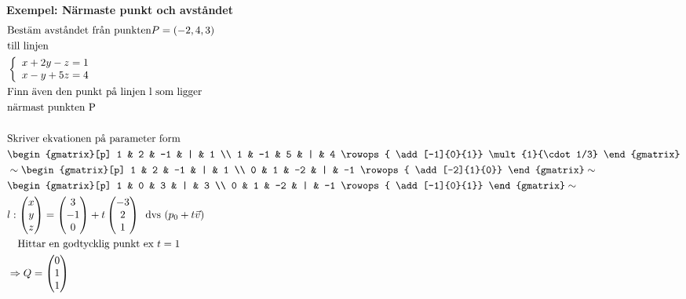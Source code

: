 \begin{multicols}{2}
\textbf{Exempel: Närmaste punkt och avståndet}
\begin{align*} 
  &\text{Bestäm avståndet från punkten} P=(-2,4,3) \\
  &\text{till linjen } \\
  &\left\{\begin{array}{r}
  x+2y-z=1 \\
  x-y+5z=4 
  \end{array}\right. \\  
  &\text{Finn även den punkt på linjen l som ligger} \\
  &\text{närmast punkten P}  \\
  &\\
  &\text{Skriver ekvationen på parameter form } \\
  &\begin{gmatrix}[p]
    1 & 2  & -1 & | & 1 \\
    1 & -1 &  5 & | & 4
    \rowops{
      \add[-1]{0}{1}}
      \mult{1}{\cdot 1/3}
  \end{gmatrix} \\
  &\sim{}
  \begin{gmatrix}[p]
    1 & 2  & -1 & | & 1 \\
    0 & 1 &  -2 & | & -1
    \rowops{
    \add[-2]{1}{0}}
  \end{gmatrix} \sim{}  \\
  &\begin{gmatrix}[p]
    1 & 0  &  3 & | & 3 \\
    0 & 1 &  -2 & | & -1
    \rowops{
    \add[-1]{0}{1}}
  \end{gmatrix} \sim{}  \\
  &l:\begin{pmatrix} x \\ y \\ z \end{pmatrix} =
  \begin{pmatrix} 3 \\ -1 \\ 0 \end{pmatrix}+
  t\begin{pmatrix} -3 \\ 2 \\ 1 \end{pmatrix}  \, \text{ dvs } (p_0 + t\vec{v})\\
  &\quad  \text{Hittar en godtycklig punkt ex } t=1 \\
  &\Rightarrow Q=\begin{pmatrix} 0 \\ 1 \\ 1 \end{pmatrix}  \\

\end{align*}
\end{multicols}
